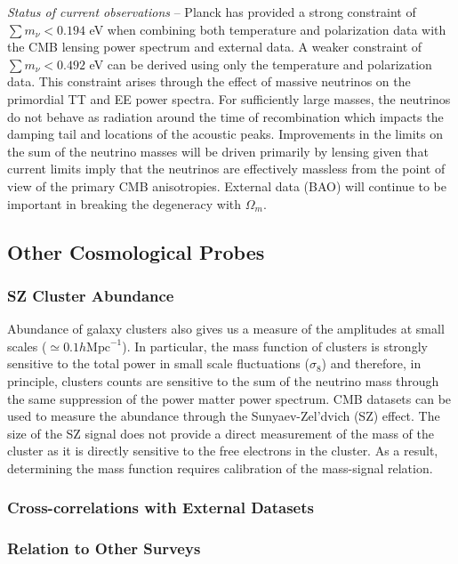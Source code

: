 {\it Status of current observations} -- Planck has provided a strong constraint of $\sum m_\nu < 0.194$ eV when combining both temperature and polarization data with the CMB lensing power spectrum and external data.  A weaker constraint of $\sum m_\nu < 0.492$ eV can be derived using only the temperature and polarization data.  This constraint arises through the effect of massive neutrinos on the primordial TT and EE power spectra.  For sufficiently large masses, the neutrinos do not behave as radiation around the time of recombination which impacts the damping tail and locations of the acoustic peaks.  Improvements in the limits on the sum of the neutrino masses will be driven primarily by lensing given that current limits imply that the neutrinos are effectively massless from the point of view of the primary CMB anisotropies.  External data (BAO) will continue to be important in breaking the degeneracy with $\Omega_m$.  

\subsection{Other Cosmological Probes}

\subsubsection{SZ Cluster Abundance}

Abundance of galaxy clusters also gives us a measure of the 
amplitudes at small scales ($\simeq 0.1h\mathrm{Mpc}^{-1}$).  In particular, the mass function of clusters is strongly sensitive to the total power in small scale fluctuations ($\sigma_8$) and therefore, in principle, clusters counts are sensitive to the sum of the neutrino mass through the same suppression of the power matter power spectrum.
%
CMB datasets can be used to measure the abundance through the
Sunyaev-Zel'dvich (SZ) effect.  The size of the SZ signal does not provide a direct measurement of the mass of the cluster as it is directly sensitive to the free electrons in the cluster.  As a result, determining the mass function requires calibration of the mass-signal relation.  
%


\subsubsection{Cross-correlations with External Datasets}

\subsubsection{Relation to Other Surveys}

